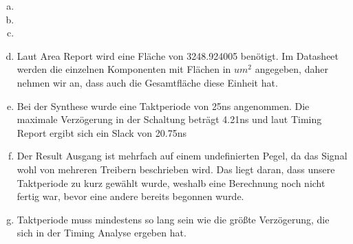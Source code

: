 \documentclass[a4paper]{scrartcl}
\begin{document}
	\begin{enumerate}[(a)]
		\item 
		\item 
		\item 
		\item Laut Area Report wird eine Fläche von 3248.924005 benötigt. Im Datasheet werden die einzelnen Komponenten mit Flächen in $um^2$ angegeben, daher nehmen wir an, dass auch die Gesamtfläche diese Einheit hat.
		
		\item Bei der Synthese wurde eine Taktperiode von 25ns angenommen. Die maximale Verzögerung in der Schaltung beträgt 4.21ns und laut Timing Report ergibt sich ein Slack von 20.75ns
		\item Der Result Ausgang ist mehrfach auf einem undefinierten Pegel, da das Signal wohl von mehreren Treibern beschrieben wird. Das liegt daran, dass unsere Taktperiode zu kurz gewählt wurde, weshalb eine Berechnung noch nicht fertig war, bevor eine andere bereits begonnen wurde.
		\item Taktperiode muss mindestens so lang sein wie die größte Verzögerung, die sich in der Timing Analyse ergeben hat.
	\end{enumerate}

	
\end{document}

